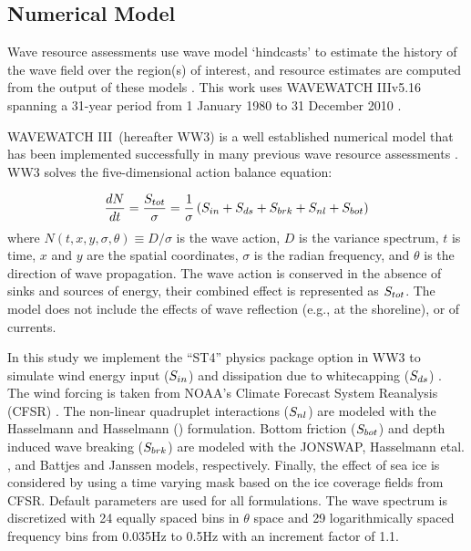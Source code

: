\subsection{Numerical Model} \label{sec:method:model}

Wave resource assessments use wave model `hindcasts' to estimate the history of the wave field over the region(s) of interest, and resource estimates are computed from the output of these models \citep{internationalelectrotechnicalcommissionPart101Wave2015}. This work uses WAVEWATCH III\textregistered v5.16 spanning a 31-year period from 1 January 1980 to 31 December 2010 \citep{tolmanDistributedmemoryConceptsWave2002, tolmanwavewatch}.

WAVEWATCH III\textregistered \ (hereafter WW3) is a well established numerical model that has been implemented successfully in many previous wave resource assessments \citep[e.g.,][]{garcia-medinaWaveResourceAssessment2014, hemerRevisedAssessmentAustralia2017, yangWaveModelTest2017}.
WW3 solves the five-dimensional action balance equation:

\begin{align}
  \frac{d N}{d t} = \frac{S_{ tot }}{\sigma} = \frac{1}{\sigma}\left ( S_{ in } + S_{ ds } + S_{ brk } + S_{ nl } + S_{ bot } \right )
  \label{eqn:actionbalance}
\end{align}
where $N(t,x,y,\sigma,\theta) \equiv D/\sigma$ is the wave action, $D$ is the variance spectrum, $t$ is time, $x$ and $y$ are the spatial coordinates, $\sigma$ is the radian frequency, and $\theta$ is the direction of wave propagation.
The wave action is conserved in the absence of sinks and sources of energy, their combined effect is represented as $S_{ tot }$. The model does not include the effects of wave reflection (e.g., at the shoreline), or of currents.

In this study we implement the ``ST4'' physics package option in WW3 to simulate wind energy input ($S_{ in }$) and dissipation due to whitecapping ($S_{ ds }$) \citep{ardhuinObservationSwellDissipation2009}.
The wind forcing is taken from NOAA's Climate Forecast System Reanalysis (CFSR) \citep{sahaNCEPClimateForecast2010}. The non-linear quadruplet interactions ($S_{ nl }$) are modeled with the Hasselmann and Hasselmann (\citeyear{hasselmannComputationsParameterizationsNonlinear1985}) formulation. Bottom friction ($S_{ bot }$) and depth induced wave breaking ($S_{ brk }$) are modeled with the JONSWAP, Hasselmann etal. \citeyear{hasselmannMeasurementsWindwaveGrowth1973}, and Battjes and Janssen \citeyear{battjesEnergyLossSetup1978} models, respectively. Finally, the effect of sea ice is considered by using a time varying mask based on the ice coverage fields from CFSR. Default parameters are used for all formulations. The wave spectrum is discretized with 24 equally spaced bins in $\theta$ space and 29 logarithmically spaced frequency bins from 0.035Hz to 0.5Hz with an increment factor of 1.1.


